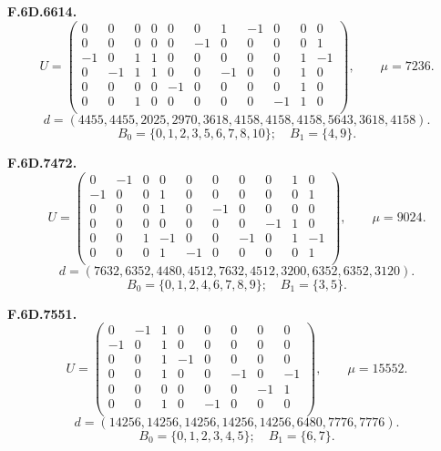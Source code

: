 \par\medskip\noindent\begin{minipage}{\linewidth}\textbf{F.6D.6614.}
\begingroup\small\setlength{\arraycolsep}{3pt}
\[U=\begin{pmatrix}
0 & 0 & 0 & 0 & 0 & 0 & 1 & -1 & 0 & 0 & 0\\
0 & 0 & 0 & 0 & 0 & -1 & 0 & 0 & 0 & 0 & 1\\
-1 & 0 & 1 & 1 & 0 & 0 & 0 & 0 & 0 & 1 & -1\\
0 & -1 & 1 & 1 & 0 & 0 & -1 & 0 & 0 & 1 & 0\\
0 & 0 & 0 & 0 & -1 & 0 & 0 & 0 & 0 & 1 & 0\\
0 & 0 & 1 & 0 & 0 & 0 & 0 & 0 & -1 & 1 & 0\\
\end{pmatrix},\qquad \mu=7236.\]
\[d=(4455,4455,2025,2970,3618,4158,4158,4158,5643,3618,4158).\]
\[B_0=\{0,1,2,3,5,6,7,8,10\};\quad B_1=\{4,9\}.\]
\endgroup\end{minipage}\par
\par\medskip\noindent\begin{minipage}{\linewidth}\textbf{F.6D.7472.}
\begingroup\small\setlength{\arraycolsep}{3pt}
\[U=\begin{pmatrix}
0 & -1 & 0 & 0 & 0 & 0 & 0 & 0 & 1 & 0\\
-1 & 0 & 0 & 1 & 0 & 0 & 0 & 0 & 0 & 1\\
0 & 0 & 0 & 1 & 0 & -1 & 0 & 0 & 0 & 0\\
0 & 0 & 0 & 0 & 0 & 0 & 0 & -1 & 1 & 0\\
0 & 0 & 1 & -1 & 0 & 0 & -1 & 0 & 1 & -1\\
0 & 0 & 0 & 1 & -1 & 0 & 0 & 0 & 0 & 1\\
\end{pmatrix},\qquad \mu=9024.\]
\[d=(7632,6352,4480,4512,7632,4512,3200,6352,6352,3120).\]
\[B_0=\{0,1,2,4,6,7,8,9\};\quad B_1=\{3,5\}.\]
\endgroup\end{minipage}\par
\par\medskip\noindent\begin{minipage}{\linewidth}\textbf{F.6D.7551.}
\begingroup\small\setlength{\arraycolsep}{3pt}
\[U=\begin{pmatrix}
0 & -1 & 1 & 0 & 0 & 0 & 0 & 0\\
-1 & 0 & 1 & 0 & 0 & 0 & 0 & 0\\
0 & 0 & 1 & -1 & 0 & 0 & 0 & 0\\
0 & 0 & 1 & 0 & 0 & -1 & 0 & -1\\
0 & 0 & 0 & 0 & 0 & 0 & -1 & 1\\
0 & 0 & 1 & 0 & -1 & 0 & 0 & 0\\
\end{pmatrix},\qquad \mu=15552.\]
\[d=(14256,14256,14256,14256,14256,6480,7776,7776).\]
\[B_0=\{0,1,2,3,4,5\};\quad B_1=\{6,7\}.\]
\endgroup\end{minipage}\par
